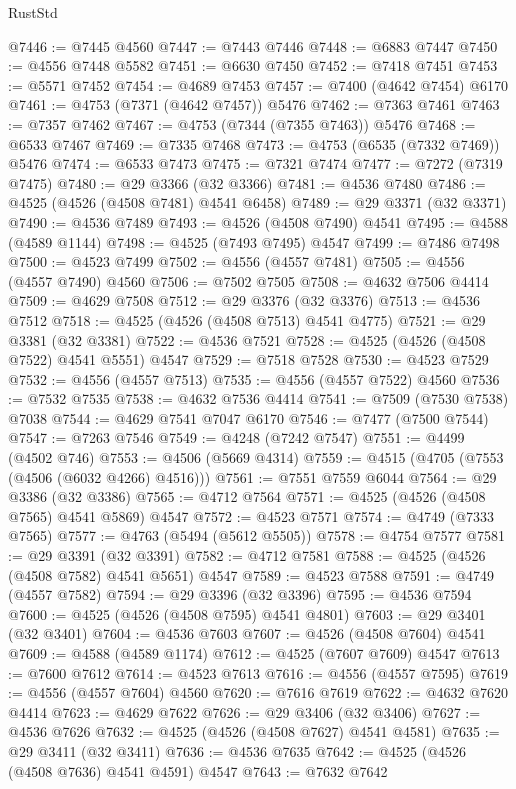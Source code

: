\begin{lexlean}{RustStd}
\begin{coremodule}
@7446 := @7445 @4560
@7447 := @7443 @7446
@7448 := @6883 @7447
@7450 := @4556 @7448 @5582
@7451 := @6630 @7450
@7452 := @7418 @7451
@7453 := @5571 @7452
@7454 := @4689 @7453
@7457 := @7400 (@4642 @7454) @6170
@7461 := @4753 (@7371 (@4642 @7457)) @5476
@7462 := @7363 @7461
@7463 := @7357 @7462
@7467 := @4753 (@7344 (@7355 @7463)) @5476
@7468 := @6533 @7467
@7469 := @7335 @7468
@7473 := @4753 (@6535 (@7332 @7469)) @5476
@7474 := @6533 @7473
@7475 := @7321 @7474
@7477 := @7272 (@7319 @7475)
@7480 := @29 @3366 (@32 @3366)
@7481 := @4536 @7480
@7486 := @4525 (@4526 (@4508 @7481) @4541 @6458)
@7489 := @29 @3371 (@32 @3371)
@7490 := @4536 @7489
@7493 := @4526 (@4508 @7490) @4541
@7495 := @4588 (@4589 @1144)
@7498 := @4525 (@7493 @7495) @4547
@7499 := @7486 @7498
@7500 := @4523 @7499
@7502 := @4556 (@4557 @7481)
@7505 := @4556 (@4557 @7490) @4560
@7506 := @7502 @7505
@7508 := @4632 @7506 @4414
@7509 := @4629 @7508
@7512 := @29 @3376 (@32 @3376)
@7513 := @4536 @7512
@7518 := @4525 (@4526 (@4508 @7513) @4541 @4775)
@7521 := @29 @3381 (@32 @3381)
@7522 := @4536 @7521
@7528 := @4525 (@4526 (@4508 @7522) @4541 @5551) @4547
@7529 := @7518 @7528
@7530 := @4523 @7529
@7532 := @4556 (@4557 @7513)
@7535 := @4556 (@4557 @7522) @4560
@7536 := @7532 @7535
@7538 := @4632 @7536 @4414
@7541 := @7509 (@7530 @7538) @7038
@7544 := @4629 @7541 @7047 @6170
@7546 := @7477 (@7500 @7544)
@7547 := @7263 @7546
@7549 := @4248 (@7242 @7547)
@7551 := @4499 (@4502 @746)
@7553 := @4506 (@5669 @4314)
@7559 := @4515 (@4705 (@7553 (@4506 (@6032 @4266) @4516)))
@7561 := @7551 @7559 @6044
@7564 := @29 @3386 (@32 @3386)
@7565 := @4712 @7564
@7571 := @4525 (@4526 (@4508 @7565) @4541 @5869) @4547
@7572 := @4523 @7571
@7574 := @4749 (@7333 @7565)
@7577 := @4763 (@5494 (@5612 @5505))
@7578 := @4754 @7577
@7581 := @29 @3391 (@32 @3391)
@7582 := @4712 @7581
@7588 := @4525 (@4526 (@4508 @7582) @4541 @5651) @4547
@7589 := @4523 @7588
@7591 := @4749 (@4557 @7582)
@7594 := @29 @3396 (@32 @3396)
@7595 := @4536 @7594
@7600 := @4525 (@4526 (@4508 @7595) @4541 @4801)
@7603 := @29 @3401 (@32 @3401)
@7604 := @4536 @7603
@7607 := @4526 (@4508 @7604) @4541
@7609 := @4588 (@4589 @1174)
@7612 := @4525 (@7607 @7609) @4547
@7613 := @7600 @7612
@7614 := @4523 @7613
@7616 := @4556 (@4557 @7595)
@7619 := @4556 (@4557 @7604) @4560
@7620 := @7616 @7619
@7622 := @4632 @7620 @4414
@7623 := @4629 @7622
@7626 := @29 @3406 (@32 @3406)
@7627 := @4536 @7626
@7632 := @4525 (@4526 (@4508 @7627) @4541 @4581)
@7635 := @29 @3411 (@32 @3411)
@7636 := @4536 @7635
@7642 := @4525 (@4526 (@4508 @7636) @4541 @4591) @4547
@7643 := @7632 @7642

\end{coremodule}
\end{lexlean}
